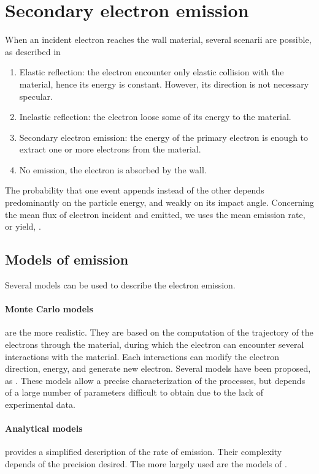 
\section{Secondary electron emission}

When an incident electron reaches the wall material, several scenarii are possible, as described in \citet{villemant}
\begin{enumerate}
  \item Elastic reflection: the electron encounter only elastic collision with the material, hence its energy is constant. However, its direction is not necessary specular.
  \item Inelastic reflection: the electron loose some of its energy to the material.
  \item Secondary electron emission: the energy of the primary electron is enough to extract one or more electrons from the material.
  \item No emission, the electron is absorbed by the wall.
\end{enumerate}

The probability \proba  that one event appends instead of the other depends predominantly on the particle energy, and weakly on its  impact angle.
Concerning the mean flux of electron incident and emitted, we uses the mean emission rate, or yield, \rate.

\subsection{Models of emission } \label{subsec-seemodels}
Several models can be used to describe the electron emission.

\paragraph{Monte Carlo models} are the more realistic.
 They are based on the computation of the trajectory of the electrons through the material, during which the electron can encounter several interactions with the material.
 Each interactions can modify the electron direction, energy, and generate new electron.
 Several models have been proposed, as \citet{furman2002,pierron2017}.
 These models allow a precise characterization of the processes, but depends of a large number of parameters difficult to obtain due to the lack of experimental data.
 
\paragraph{Analytical models} provides a simplified description of the rate of emission.
Their complexity depends of the precision desired.
The more largely used are the models of \citet{vaughan1989,barral2003a,sydorenko2006b}.

